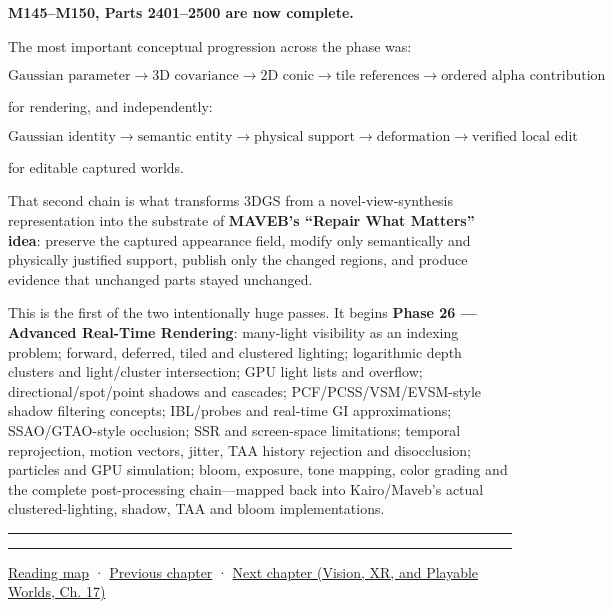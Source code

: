\textbf{M145--M150, Parts 2401--2500 are now complete.}

The most important conceptual progression across the phase was:

\[
\boxed{
\text{Gaussian parameter}
\rightarrow
\text{3D covariance}
\rightarrow
\text{2D conic}
\rightarrow
\text{tile references}
\rightarrow
\text{ordered alpha contribution}
}
\]

for rendering, and independently:

\[
\boxed{
\text{Gaussian identity}
\rightarrow
\text{semantic entity}
\rightarrow
\text{physical support}
\rightarrow
\text{deformation}
\rightarrow
\text{verified local edit}
}
\]

for editable captured worlds.

That second chain is what transforms 3DGS from a novel-view-synthesis representation into the substrate of \textbf{MAVEB's ``Repair What Matters'' idea}: preserve the captured appearance field, modify only semantically and physically justified support, publish only the changed regions, and produce evidence that unchanged parts stayed unchanged.

This is the first of the two intentionally huge passes. It begins \textbf{Phase 26 --- Advanced Real-Time Rendering}: many-light visibility as an indexing problem; forward, deferred, tiled and clustered lighting; logarithmic depth clusters and light/cluster intersection; GPU light lists and overflow; directional/spot/point shadows and cascades; PCF/PCSS/VSM/EVSM-style shadow filtering concepts; IBL/probes and real-time GI approximations; SSAO/GTAO-style occlusion; SSR and screen-space limitations; temporal reprojection, motion vectors, jitter, TAA history rejection and disocclusion; particles and GPU simulation; bloom, exposure, tone mapping, color grading and the complete post-processing chain---mapped back into Kairo/Maveb's actual clustered-lighting, shadow, TAA and bloom implementations.

\begin{center}\rule{0.5\linewidth}{0.5pt}\end{center}

\begin{center}\rule{0.5\linewidth}{0.5pt}\end{center}

\hyperref[volume-reading-map]{Reading map} · \hyperref[06-engine-ii-ch044-cross-backend-conversion-and-agreement]{Previous chapter} · \href{../07-Vision-XR-and-Playable-Worlds/main.pdf\#nameddest=06-engine-ii-ch046-game-design-from-mechanics-to-narrative-interfaces}{Next chapter (Vision, XR, and Playable Worlds, Ch. 17)}
